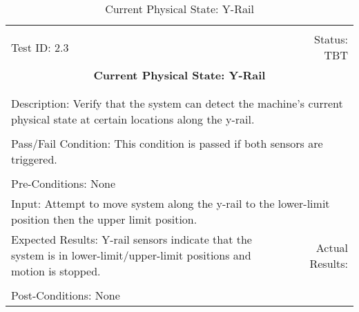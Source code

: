 \documentclass[titlepage]{article}
\begin{document}
\begin{center}%
\begin{table}[h!]
\begin{tabular}{|l r|}\hline&\\[-2mm]
	Test ID: 2.3	&Status: TBT\\[-3mm]
	\multicolumn{2}{|c|}{\textbf{\large{Current Physical State: Y-Rail}}}\\&\\\hline&\\[-3mm]
	\multicolumn{2}{|p{\textwidth}|}{Description: Verify that the system can detect the machine's current physical state at certain locations along the y-rail.}\\[1mm]\hline&\\[-3mm]
	\multicolumn{2}{|p{\textwidth}|}{Pass/Fail Condition: This condition is passed if both sensors are triggered.}\\[1mm]\hline&\\[-3mm]
	\multicolumn{2}{|p{\textwidth}|}{Pre-Conditions: None}\\[4mm]
	\multicolumn{2}{|p{\textwidth}|}{Input: Attempt to move system along the y-rail to the lower-limit position then the upper limit position.}\\[2mm]\hline
	\multicolumn{1}{|p{0.49\textwidth}}{Expected Results: Y-rail sensors indicate that the system is in lower-limit/upper-limit positions and motion is stopped.}	&\multicolumn{1}{|p{0.45\textwidth}|}{Actual Results:}\\\hline&\\[-3mm]
	\multicolumn{2}{|p{\textwidth}|}{Post-Conditions: None}\\\hline
\end{tabular}
\caption{Current Physical State: Y-Rail}
\end{table}
\end{center}
\newpage
\end{document}
